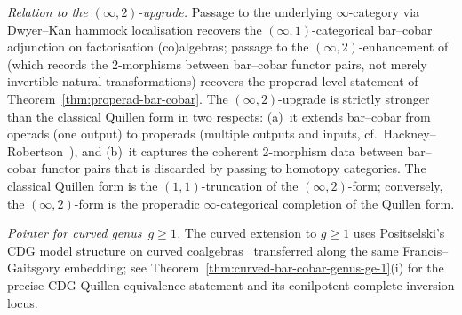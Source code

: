 \begin{remark}
\smallskip
\noindent\emph{Relation to the $(\infty,2)$-upgrade.} Passage to the
underlying $\infty$-category via Dwyer--Kan hammock localisation
recovers the $(\infty,1)$-categorical bar--cobar adjunction on
factorisation (co)algebras; passage to the $(\infty,2)$-enhancement
of~\cite[IV.5]{GR17} (which records the 2-morphisms between
bar--cobar functor pairs, not merely invertible natural
transformations) recovers the properad-level statement of
Theorem~\ref{thm:properad-bar-cobar}. The $(\infty,2)$-upgrade is
strictly stronger than the classical Quillen form in two respects:
(a)~it extends bar--cobar from operads (one output) to properads
(multiple outputs and inputs, cf.\ Hackney--Robertson~\cite{HR17}),
and (b)~it captures the coherent 2-morphism data between bar--cobar
functor pairs that is discarded by passing to homotopy categories.
The classical Quillen form is the $(1,1)$-truncation of the
$(\infty,2)$-form; conversely, the $(\infty,2)$-form is the
properadic $\infty$-categorical completion of the Quillen form.

\smallskip
\noindent\emph{Pointer for curved genus~$g \geq 1$.} The curved
extension to $g \geq 1$ uses Positselski's CDG model structure on
curved coalgebras~\cite{Positselski2011} transferred along the
same Francis--Gaitsgory embedding; see
Theorem~\ref{thm:curved-bar-cobar-genus-ge-1}(i) for the precise
CDG Quillen-equivalence statement and its conilpotent-complete
inversion locus.
\end{remark}

